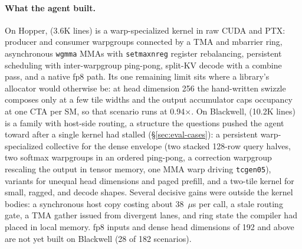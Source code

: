 \paragraph{What the agent built.} On Hopper, \fathree (3.6K lines) is a warp-specialized kernel in
raw CUDA and PTX: producer and consumer warpgroups connected by a TMA and mbarrier ring,
asynchronous \texttt{wgmma} MMAs with \texttt{setmaxnreg} register rebalancing, persistent
scheduling with inter-warpgroup ping-pong, split-KV decode with a combine pass, and a native fp8
path. Its one remaining limit sits where a library's allocator would otherwise be: at head dimension
256 the hand-written swizzle composes only at a few tile widths and the output accumulator caps
occupancy at one CTA per SM, so that scenario runs at 0.94$\times$. On Blackwell, \fafour (10.2K
lines) is a family with host-side routing, a structure the questions pushed the agent toward after a
single kernel had stalled (\S\ref{sec:eval-cases}): a persistent warp-specialized collective for the
dense envelope (two stacked 128-row query halves, two softmax warpgroups in an ordered ping-pong, a
correction warpgroup rescaling the output in tensor memory, one MMA warp driving \texttt{tcgen05}),
variants for unequal head dimensions and paged prefill, and a two-tile kernel for small, ragged, and
decode shapes. Several decisive gains were outside the kernel bodies: a synchronous host copy
costing about 38~$\mu$s per call, a stale routing gate, a TMA gather issued from divergent lanes, and
ring state the compiler had placed in local memory. fp8 inputs and dense head dimensions of 192 and
above are not yet built on Blackwell (28 of 182 scenarios).

